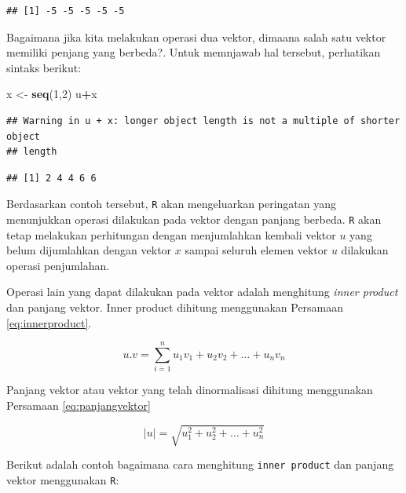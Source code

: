 \documentclass[]{book}
\newenvironment{Shaded}{\begin{snugshade}}{\end{snugshade}}
\newcommand{\CommentTok}[1]{\textcolor[rgb]{0.56,0.35,0.01}{\textit{#1}}}
\newcommand{\DecValTok}[1]{\textcolor[rgb]{0.00,0.00,0.81}{#1}}
\newcommand{\KeywordTok}[1]{\textcolor[rgb]{0.13,0.29,0.53}{\textbf{#1}}}
\newcommand{\NormalTok}[1]{#1}
\newcommand{\OperatorTok}[1]{\textcolor[rgb]{0.81,0.36,0.00}{\textbf{#1}}}
\newcommand{\StringTok}[1]{\textcolor[rgb]{0.31,0.60,0.02}{#1}}
\theoremstyle{definition}
\theoremstyle{definition}
\theoremstyle{definition}
\theoremstyle{remark}
\begin{document}
\begin{verbatim}
## [1] -5 -5 -5 -5 -5
\end{verbatim}

Bagaimana jika kita melakukan operasi dua vektor, dimaana salah satu vektor memiliki penjang yang berbeda?. Untuk memnjawab hal tersebut, perhatikan sintaks berikut:

\begin{Shaded}
\begin{Highlighting}[]
\NormalTok{x <-}\StringTok{ }\KeywordTok{seq}\NormalTok{(}\DecValTok{1}\NormalTok{,}\DecValTok{2}\NormalTok{)}
\NormalTok{u}\OperatorTok{+}\NormalTok{x}
\end{Highlighting}
\end{Shaded}

\begin{verbatim}
## Warning in u + x: longer object length is not a multiple of shorter object
## length
\end{verbatim}

\begin{verbatim}
## [1] 2 4 4 6 6
\end{verbatim}

Berdasarkan contoh tersebut, \texttt{R} akan mengeluarkan peringatan yang menunjukkan operasi dilakukan pada vektor dengan panjang berbeda. \texttt{R} akan tetap melakukan perhitungan dengan menjumlahkan kembali vektor \(u\) yang belum dijumlahkan dengan vektor \(x\) sampai seluruh elemen vektor \(u\) dilakukan operasi penjumlahan.

Operasi lain yang dapat dilakukan pada vektor adalah menghitung \emph{inner product} dan panjang vektor. Inner product dihitung menggunakan Persamaan \eqref{eq:innerproduct}.

\begin{equation}
u.v=\sum_{i=1}^nu_1v_1+u_2v_2+\dots+u_nv_n
  \label{eq:innerproduct}
\end{equation}

Panjang vektor atau vektor yang telah dinormalisasi dihitung menggunakan Persamaan \eqref{eq:panjangvektor}

\begin{equation}
\left|u\right|=\sqrt{u_1^2+u_2^2+\dots+u_n^2}
  \label{eq:panjangvektor}
\end{equation}

Berikut adalah contoh bagaimana cara menghitung \texttt{inner\ product} dan panjang vektor menggunakan \texttt{R}:

\begin{Shaded}
\end{Shaded}
\end{document}
